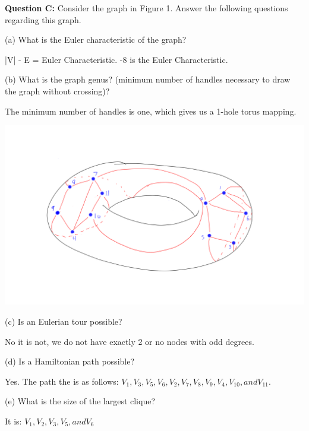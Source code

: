 \documentclass[12pt]{article}
\begin{document}
\bigskip
\noindent
\textbf{Question C:} Consider the graph in Figure 1. Answer the following questions regarding this graph.\smallskip

\smallskip
\noindent
(a) What is the Euler characteristic of the graph?\smallskip

|V| - E = Euler Characteristic.
-8 is the Euler Characteristic.

\smallskip
\noindent
(b) What is the graph genus? (minimum number of handles necessary to draw the graph without crossing)?\smallskip

The minimum number of handles is one, which gives us a 1-hole torus mapping.

	\includegraphics[width=\linewidth]{GraphTorus}


\smallskip
\noindent
(c) Is an Eulerian tour possible?\smallskip

No it is not, we do not have exactly 2 or no nodes with odd degrees. \smallskip

\newpage
\noindent
(d) Is a Hamiltonian path possible?\smallskip

Yes. The path the is as follows: $V_1, V_3, V_5, V_6, V_2, V_7, V_8, V_9, V_4, V_10, and V_11$. \smallskip

\smallskip
\noindent
(e) What is the size of the largest clique?\smallskip

It is: $V_1, V_2, V_3, V_5, and V_6$
\end{document}
